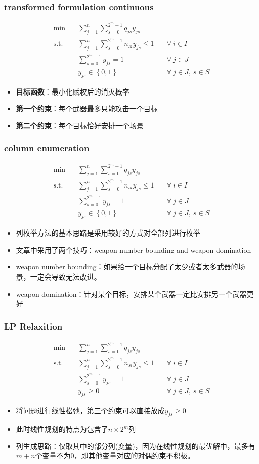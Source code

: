 \documentclass[CJK,10pt]{beamer}
\newcommand{\sumFromTo}[3]{\ensuremath{\sum_{#1}^{#2} #3}}
\newcommand{\optimalProblem}[3]
{\begin{align*}
    #1 \quad &#2 \\
    \mathrm{s. t.}\quad&#3
\end{align*}}
\begin{document}
\begin{frame}
    \frametitle{transformed formulation continuous}
    \optimalProblem{\min}{\sumFromTo{j = 1}{n}{\sumFromTo{s = 0}{2^m -1}{q_{js}y_{js}}}\tag{CG}}{\sumFromTo{j = 1}{n}{\sumFromTo{s = 0}{2^m -1}{n_{si}y_{js}}}\leq 1 \quad &\forall ~ i \in I\\& \sumFromTo{s = 0}{2^m - 1}{y_{js}} = 1 \quad &\forall ~ j \in J\\& y_{js} \in \left\{ 0,1 \right\} & \forall ~ j\in J,\ s\in S}
    \begin{itemize}
        \item \textbf{目标函数}：最小化赋权后的消灭概率
        \item \textbf{第一个约束}：每个武器最多只能攻击一个目标
        \item \textbf{第二个约束}：每个目标恰好安排一个场景
    \end{itemize}
\end{frame}
\begin{frame}
    \frametitle{column enumeration}
    \optimalProblem{\min}{\sumFromTo{j = 1}{n}{\sumFromTo{s = 0}{2^m -1}{q_{js}y_{js}}}\tag{CG}}{\sumFromTo{j = 1}{n}{\sumFromTo{s = 0}{2^m -1}{n_{si}y_{js}}}\leq 1 \quad &\forall ~ i \in I\\& \sumFromTo{s = 0}{2^m - 1}{y_{js}} = 1 \quad &\forall ~ j \in J\\& y_{js} \in \left\{ 0,1 \right\} & \forall ~ j\in J,\ s\in S}

    \begin{itemize}
        \item 列枚举方法的基本思路是采用较好的方式对全部列进行枚举
        \item 文章中采用了两个技巧：weapon number bounding and weapon domination
        \item weapon number bounding：如果给一个目标分配了太少或者太多武器的场景，一定会导致无法改进。
        \item weapon domination：针对某个目标，安排某个武器一定比安排另一个武器更好
    \end{itemize}
\end{frame}

\begin{frame}
    \frametitle{LP Relaxition}
    \optimalProblem{\min}{\sumFromTo{j = 1}{n}{\sumFromTo{s = 0}{2^m -1}{q_{js}y_{js}}}\tag{CG-LP}}{\sumFromTo{j = 1}{n}{\sumFromTo{s = 0}{2^m -1}{n_{si}y_{js}}}\leq 1 \quad &\forall ~ i \in I\\& \sumFromTo{s = 0}{2^m - 1}{y_{js}} = 1 \quad &\forall ~  j \in J\\& y_{js} \geq 0 &\forall ~ j\in J,\ s\in S}
    \begin{itemize}
        \item 将问题进行线性松弛，第三个约束可以直接放成$y_{js} \geq 0$
        \item 此时线性规划的特点为包含了$n \times 2^m$列
        \item 列生成思路：仅取其中的部分列(变量)，因为在线性规划的最优解中，最多有$m+n$个变量不为0，即其他变量对应的对偶约束不积极。
    \end{itemize}
\end{frame}
\end{document}

